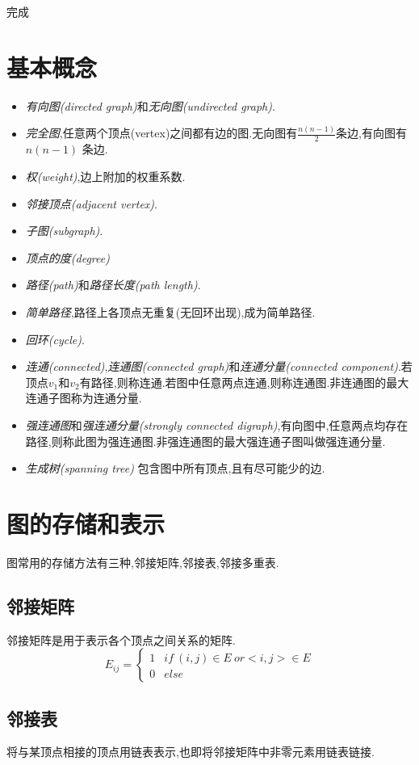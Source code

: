 \documentclass{ctexart}
\begin{document}
	
完成\newpage
\section{基本概念}
\begin{itemize}
\item \emph{有向图(directed graph)}和\emph{无向图(undirected graph)}.
\item \emph{完全图},任意两个顶点(vertex)之间都有边的图.无向图有$\frac{n(n-1)}{2}$条边,有向图有$n(n-1)$ 条边.
\item \emph{权(weight)},边上附加的权重系数.
\item \emph{邻接顶点(adjacent vertex)}.
\item \emph{子图(subgraph)}.
\item \emph{顶点的度(degree)}
\item \emph{路径(path)}和\emph{路径长度(path length)}.
\item \emph{简单路径},路径上各顶点无重复(无回环出现),成为简单路径.
\item \emph{回环(cycle)}.
\item \emph{连通(connected)},\emph{连通图(connected graph)}和\emph{连通分量(connected component)}.若顶点$v_1$和$v_2$有路径,则称连通.若图中任意两点连通,则称连通图.非连通图的最大连通子图称为连通分量.
\item \emph{强连通图}和\emph{强连通分量(strongly connected digraph)},有向图中,任意两点均存在路径,则称此图为强连通图.非强连通图的最大强连通子图叫做强连通分量.
\item \emph{生成树(spanning tree)} 包含图中所有顶点,且有尽可能少的边.
\end{itemize}
\newpage
\section{图的存储和表示}
图常用的存储方法有三种,邻接矩阵,邻接表,邻接多重表.

\subsection{邻接矩阵}
邻接矩阵是用于表示各个顶点之间关系的矩阵.
$$
E_{ij}=
\begin{cases}
1 & if\ (i,j) \in E\ or <i,j> \in E \\
0 & else
\end{cases}
$$
\subsection{邻接表}
将与某顶点相接的顶点用链表表示,也即将邻接矩阵中非零元素用链表链接.
\end{document}
